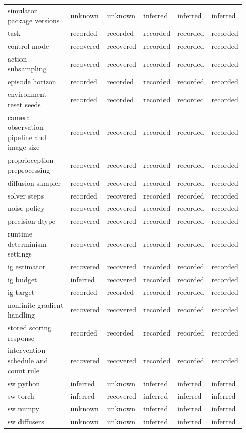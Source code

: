 \begin{longtable}{p{0.290\linewidth} p{0.120\linewidth} p{0.120\linewidth} p{0.130\linewidth} p{0.130\linewidth} p{0.130\linewidth}}
simulator package versions & unknown & unknown & inferred & inferred & inferred \\
task & recorded & recorded & recorded & recorded & recorded \\
control mode & recovered & recovered & recorded & recorded & recorded \\
action subsampling & recovered & recovered & recorded & recorded & recorded \\
episode horizon & recorded & recorded & recorded & recorded & recorded \\
environment reset seeds & recorded & recorded & recorded & recorded & recorded \\
camera observation pipeline and image size & recovered & recovered & recorded & recorded & recorded \\
proprioception preprocessing & recovered & recovered & recorded & recorded & recorded \\
diffusion sampler & recovered & recovered & recorded & recorded & recorded \\
solver steps & recorded & recovered & recorded & recorded & recorded \\
noise policy & recovered & recovered & recorded & recorded & recorded \\
precision dtype & recovered & recovered & recorded & recorded & recorded \\
runtime determinism settings & recovered & recovered & recorded & recorded & recorded \\
ig estimator & recovered & recovered & recorded & recorded & recorded \\
ig budget & inferred & recovered & recorded & recorded & recorded \\
ig target & recorded & recorded & recorded & recorded & recorded \\
nonfinite gradient handling & recovered & recovered & recorded & recorded & recorded \\
stored scoring response & recorded & recorded & recorded & recorded & recorded \\
intervention schedule and count rule & recovered & recovered & recorded & recorded & recorded \\
sw python & inferred & unknown & inferred & inferred & inferred \\
sw torch & inferred & recovered & inferred & inferred & inferred \\
sw numpy & unknown & unknown & inferred & inferred & inferred \\
sw diffusers & unknown & unknown & inferred & inferred & inferred \\

\end{longtable}
